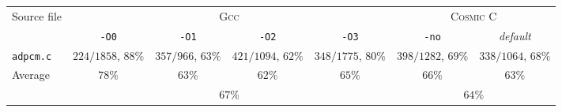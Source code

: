\begin{tabular}{ |l| |c|c|c|c| |c|c| }
  \hline
  \multirow{2}{*}{Source file}
  & \multicolumn{4}{c||}{\textsc{Gcc}}
  & \multicolumn{2}{c|}{\textsc{Cosmic C}}

  \\\cline{2-7}
  & \multicolumn{1}{c|}{\texttt{-O0}} & \multicolumn{1}{c|}{\texttt{-O1}} & \multicolumn{1}{c|}{\texttt{-O2}} & \multicolumn{1}{c||}{\texttt{-O3}}
  & \multicolumn{1}{c|}{\texttt{-no}} & \multicolumn{1}{c|}{\emph{default}}

  \\\hline\hline
  \verb|adpcm.c|
  & $224/1858$, $88\%$ & $357/966$, $63\%$ & $421/1094$, $62\%$ & $348/1775$, $80\%$
&               $398/1282$,                $69\%$ &               $338/1064$,                $68\%$

    \\\hline\hline
  \multirow{2}{*}{Average}
  & \multicolumn{1}{c|}{$78\%$} & \multicolumn{1}{c|}{$63\%$} & \multicolumn{1}{c|}{$62\%$} & \multicolumn{1}{c||}{$65\%$}
  & \multicolumn{1}{c|}{$66\%$} & \multicolumn{1}{c|}{$63\%$}

  \\\cline{2-7}  
  & \multicolumn{4}{c||}{$67\%$}
  & \multicolumn{2}{c|}{$64\%$}

  \\\hline
\end{tabular}
